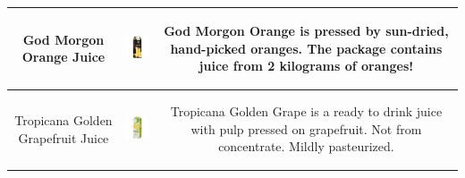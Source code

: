 \begin{table}[!ht]
{\begin{tabular}{c c c}
         
        \toprule
         \multicolumn{1}{p{1.5cm}}{\vspace{-17mm} {\footnotesize God Morgon Orange Juice} } &
          \includegraphics[width=21mm, height=21mm]{PaperB/appendix/figures/iconic_images/God-Morgon-Orange-Juice_Clean.jpg}  & 
         \multicolumn{1}{p{12cm}}{\vspace{-15mm} {\footnotesize God Morgon Orange is pressed by sun-dried, hand-picked oranges. The package contains juice from 2 kilograms of oranges!} } \\
         
         \toprule
         \multicolumn{1}{p{1.5cm}}{\vspace{-18mm} {\footnotesize Tropicana Golden Grapefruit Juice} } &
          \includegraphics[width=21mm, height=21mm]{PaperB/appendix/figures/iconic_images/Tropicana-Golden-Grapefruit_Clean.jpg}  & 
         \multicolumn{1}{p{12cm}}{\vspace{-17mm} {\footnotesize Tropicana Golden Grape is a ready to drink juice with pulp pressed on grapefruit. Not from concentrate. Mildly pasteurized.} } \\
         
        \toprule
    \end{tabular}
	}

    \label{tab:grocerystore_dataset_descriptions}
\end{table}

\clearpage


